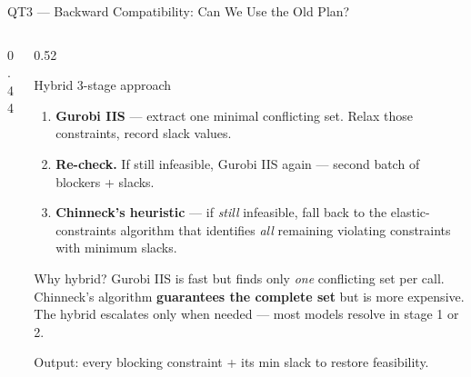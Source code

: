 \documentclass[aspectratio=169,10pt]{beamer}
\begin{document}
\begin{frame}[t]{QT3 — Backward Compatibility: Can We Use the Old Plan?}
\begin{columns}[T]
\begin{column}{0.44\textwidth}
\begin{center}
    \end{center}
  \end{column}
  \begin{column}{0.52\textwidth}
    \vspace{2pt}
    \begin{block}{Hybrid 3-stage approach}
      \small
      \begin{enumerate}\setlength\itemsep{2pt}
        \item \textbf{Gurobi IIS} — extract one minimal
              conflicting set. Relax those constraints,
              record slack values.
        \item \textbf{Re-check.} If still infeasible,
              Gurobi IIS again — second batch of
              blockers + slacks.
        \item \textbf{Chinneck's heuristic} — if
              \emph{still} infeasible, fall back to
              the elastic-constraints algorithm that
              identifies \emph{all} remaining violating
              constraints with minimum slacks.
      \end{enumerate}
    \end{block}
    \vspace{3pt}
    \begin{block}{Why hybrid?}
      \small Gurobi IIS is fast but finds only \emph{one}
      conflicting set per call. Chinneck's algorithm
      \textbf{guarantees the complete set} but is more
      expensive. The hybrid escalates only when needed —
      most models resolve in stage 1 or 2.
    \end{block}
    \vspace{3pt}
    \textcolor{mgray}{\scriptsize
      Output: every blocking constraint + its min slack to restore feasibility.}
  \end{column}
\end{columns}
\end{frame}
\end{document}
